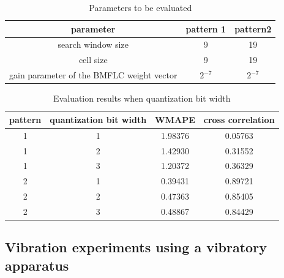 \begin{table}[tb]
  \centering
  \caption {Parameters to be evaluated}
  \label{table:quan_param}
  \begin{tabular}{|c|c|c|}
    \hline
    parameter                & pattern 1 & pattern2 \\ \hline \hline
    search window size       &   9       &   19 \\\hline
    cell size                &   9       &   19 \\\hline
    gain parameter of the BMFLC weight vector & $2^{-7}$ & $2^{-7}$  \\ \hline
  \end{tabular}
\end{table}



\begin{table}[tb]
  \centering
  \caption{Evaluation results when quantization bit width}
  \label{table:quan}
  \begin{tabular}{|c|c|c|c|}
    \hline
    pattern & quantization bit width   & WMAPE & cross correlation     \\ \hline \hline
    1       &  1         &1.98376   &  0.05763       \\ \hline
    1       &  2         &1.42930   &  0.31552    \\ \hline
    1       &  3         &1.20372   &  0.36329 \\ \hline
    2       &  1         &0.39431   &  0.89721  \\ \hline
    2       &  2         &0.47363   &  0.85405  \\ \hline
    2       &  3         &0.48867   &  0.84429   \\ \hline
  \end{tabular}
\end{table}






\subsection{Vibration experiments using a vibratory apparatus}\label{subsection:eval:add_experiment}

